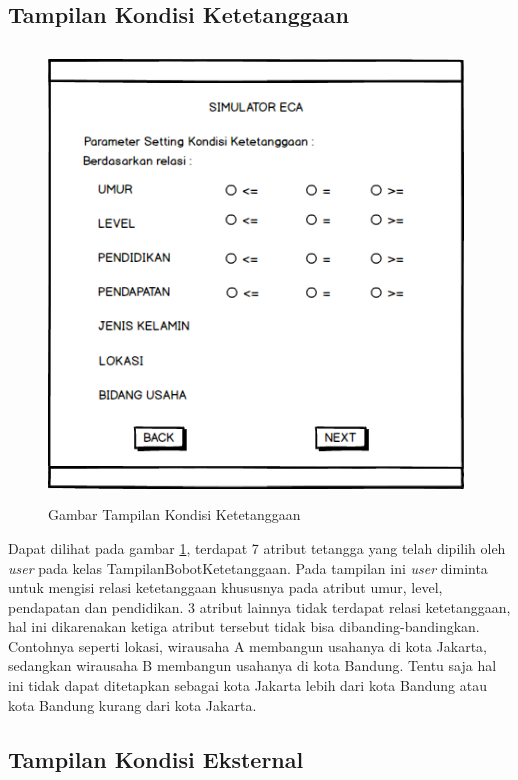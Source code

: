 \subsection{Tampilan Kondisi Ketetanggaan}

\begin{figure} [H]
	\centering  
	\includegraphics[width=11cm, height=12cm]{mockup2} 
	\caption[Gambar Tampilan Kondisi Ketetanggaan]{Gambar Tampilan Kondisi Ketetanggaan}
	\label{fig:kondisiTetangga} 
\end{figure}

Dapat dilihat pada gambar \ref{fig:kondisiTetangga}, terdapat 7 atribut tetangga yang telah dipilih oleh \textit{user} pada kelas TampilanBobotKetetanggaan. Pada tampilan ini \textit{user} diminta untuk mengisi relasi ketetanggaan khususnya pada atribut umur, level, pendapatan dan pendidikan. 3 atribut lainnya tidak terdapat relasi ketetanggaan, hal ini dikarenakan ketiga atribut tersebut tidak bisa dibanding-bandingkan. Contohnya seperti lokasi, wirausaha A membangun usahanya di kota Jakarta, sedangkan wirausaha B membangun usahanya di kota Bandung. Tentu saja hal ini tidak dapat ditetapkan sebagai kota Jakarta lebih dari kota Bandung atau kota Bandung kurang dari kota Jakarta.

\subsection{Tampilan Kondisi Eksternal}

